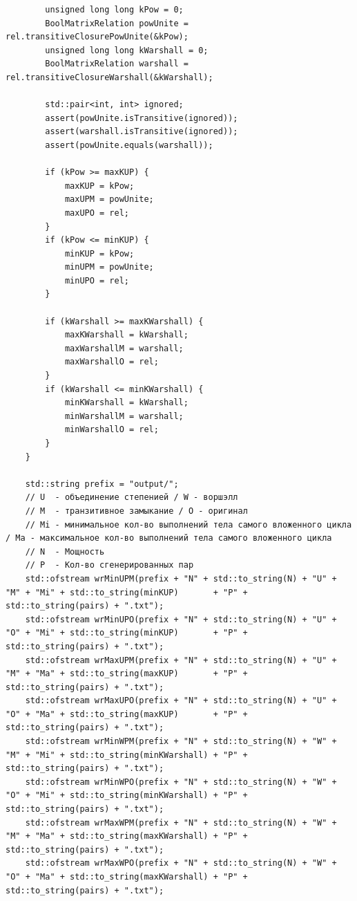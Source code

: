 \documentclass[a4paper,14pt]{extarticle}
\begin{document}
\begin{enumerate}[1.]
\begin{verbatim}
        unsigned long long kPow = 0;
        BoolMatrixRelation powUnite = rel.transitiveClosurePowUnite(&kPow);
        unsigned long long kWarshall = 0;
        BoolMatrixRelation warshall = rel.transitiveClosureWarshall(&kWarshall);

        std::pair<int, int> ignored;
        assert(powUnite.isTransitive(ignored));
        assert(warshall.isTransitive(ignored));
        assert(powUnite.equals(warshall));

        if (kPow >= maxKUP) {
            maxKUP = kPow;
            maxUPM = powUnite;
            maxUPO = rel;
        }
        if (kPow <= minKUP) {
            minKUP = kPow;
            minUPM = powUnite;
            minUPO = rel;
        }

        if (kWarshall >= maxKWarshall) {
            maxKWarshall = kWarshall;
            maxWarshallM = warshall;
            maxWarshallO = rel;
        }
        if (kWarshall <= minKWarshall) {
            minKWarshall = kWarshall;
            minWarshallM = warshall;
            minWarshallO = rel;
        }
    }

    std::string prefix = "output/";
    // U  - объединение степенией / W - воршэлл
    // M  - транзитивное замыкание / O - оригинал
    // Mi - минимальное кол-во выполнений тела самого вложенного цикла / Ma - максимальное кол-во выполнений тела самого вложенного цикла
    // N  - Мощность
    // P  - Кол-во сгенерированных пар 
    std::ofstream wrMinUPM(prefix + "N" + std::to_string(N) + "U" + "M" + "Mi" + std::to_string(minKUP)       + "P" + std::to_string(pairs) + ".txt");
    std::ofstream wrMinUPO(prefix + "N" + std::to_string(N) + "U" + "O" + "Mi" + std::to_string(minKUP)       + "P" + std::to_string(pairs) + ".txt");
    std::ofstream wrMaxUPM(prefix + "N" + std::to_string(N) + "U" + "M" + "Ma" + std::to_string(maxKUP)       + "P" + std::to_string(pairs) + ".txt");
    std::ofstream wrMaxUPO(prefix + "N" + std::to_string(N) + "U" + "O" + "Ma" + std::to_string(maxKUP)       + "P" + std::to_string(pairs) + ".txt");
    std::ofstream wrMinWPM(prefix + "N" + std::to_string(N) + "W" + "M" + "Mi" + std::to_string(minKWarshall) + "P" + std::to_string(pairs) + ".txt");
    std::ofstream wrMinWPO(prefix + "N" + std::to_string(N) + "W" + "O" + "Mi" + std::to_string(minKWarshall) + "P" + std::to_string(pairs) + ".txt");
    std::ofstream wrMaxWPM(prefix + "N" + std::to_string(N) + "W" + "M" + "Ma" + std::to_string(maxKWarshall) + "P" + std::to_string(pairs) + ".txt");
    std::ofstream wrMaxWPO(prefix + "N" + std::to_string(N) + "W" + "O" + "Ma" + std::to_string(maxKWarshall) + "P" + std::to_string(pairs) + ".txt");
    

\end{verbatim}
\end{enumerate}
\end{document}
